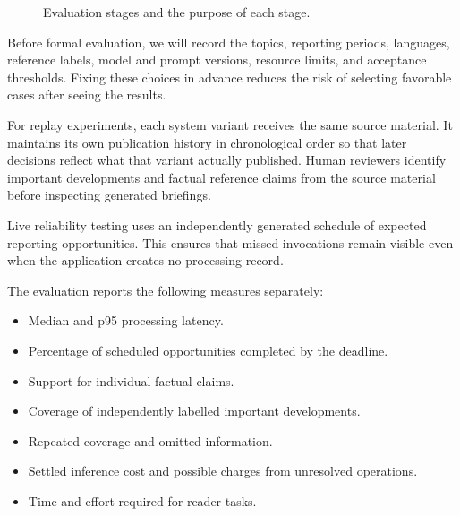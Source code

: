 \begin{figure}[htbp]
\centering
{}
\caption{Evaluation stages and the purpose of each stage.}
\label{fig:evaluation}
\end{figure}

Before formal evaluation, we will record the topics, reporting periods, languages, reference labels, model and prompt versions, resource limits, and acceptance thresholds. Fixing these choices in advance reduces the risk of selecting favorable cases after seeing the results.

For replay experiments, each system variant receives the same source material. It maintains its own publication history in chronological order so that later decisions reflect what that variant actually published. Human reviewers identify important developments and factual reference claims from the source material before inspecting generated briefings.

Live reliability testing uses an independently generated schedule of expected reporting opportunities. This ensures that missed invocations remain visible even when the application creates no processing record.

The evaluation reports the following measures separately:

\begin{itemize}
    \item Median and p95 processing latency.
    \item Percentage of scheduled opportunities completed by the deadline.
    \item Support for individual factual claims.
    \item Coverage of independently labelled important developments.
    \item Repeated coverage and omitted information.
    \item Settled inference cost and possible charges from unresolved operations.
    \item Time and effort required for reader tasks.
\end{itemize}

